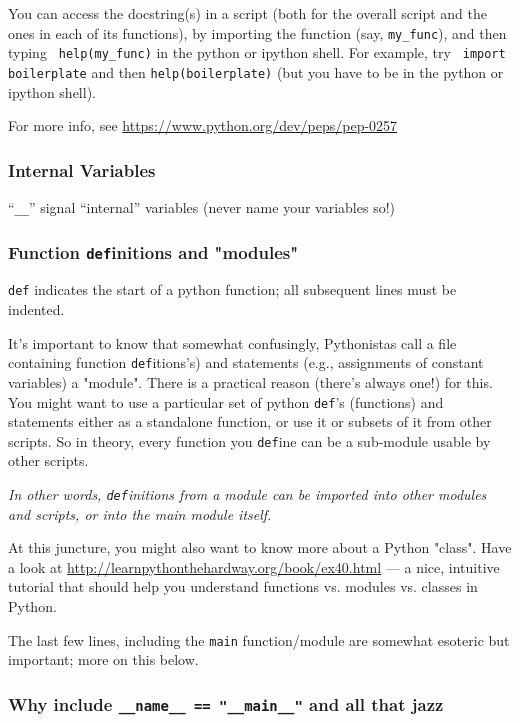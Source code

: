 You can access the docstring(s) in a script (both 
for the overall script and the ones in each of its functions), by 
importing the function (say, {\tt my\_func}), and then typing {\tt 
help(my\_func)} in the python or ipython shell. For example, try {\tt 
import boilerplate} and then {\tt help(boilerplate)} (but you have 
to be in the python or ipython shell). 

For more info, see \url{https://www.python.org/dev/peps/pep-0257}

\subsubsection{Internal Variables}

``{\tt \_\_}'' signal ``internal'' variables (never name your
variables so!)

\subsubsection{Function {\tt def}initions and "modules"}

{\tt def} indicates the start of a python function; all subsequent 
lines must be indented.

It's important to know that somewhat confusingly, Pythonistas 
call a file containing function {\tt def}itions's) and statements 
(e.g., assignments of constant variables) a "module". There is a 
practical reason (there's always one!) for this. You might want to use 
a particular set of python {\tt def}'s (functions) and statements 
either as a standalone function, or use it or subsets of it from other 
scripts. So in theory, every function you {\tt def}ine can be a 
sub-module usable by other scripts. 

{\it In other words, {\tt def}initions from a module can be imported 
into other modules and scripts, or into the main module itself.} 

At this juncture, you might also want to know more about a Python 
"class". Have a look at 
\url{http://learnpythonthehardway.org/book/ex40.html} --- a nice, 
intuitive tutorial that should help you understand functions vs. 
modules vs. classes in Python.

The last few lines, including the {\tt main} function/module are 
somewhat esoteric but important; more on this below.
 
\subsubsection{Why include {\tt \_\_name\_\_ == "\_\_main\_\_"} and all 
that jazz}

